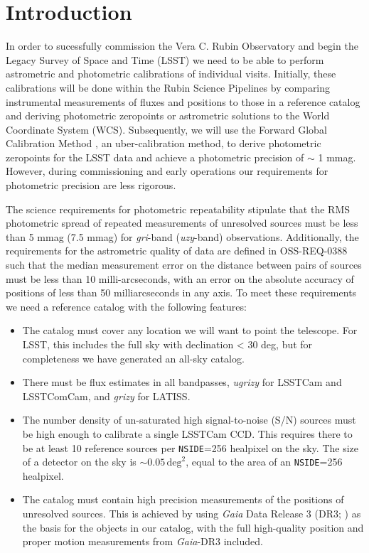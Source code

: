 \section{Introduction}
In order to sucessfully commission the Vera C. Rubin Observatory and begin the Legacy Survey of Space and Time (LSST) we need to be able to perform astrometric and photometric calibrations of individual visits.
Initially, these calibrations will be done within the Rubin Science Pipelines by comparing instrumental measurements of fluxes and positions to those in a reference catalog and deriving photometric zeropoints or astrometric solutions to the World Coordinate System (WCS).
Subsequently, we will use the Forward Global Calibration Method \citep[FGCM;][]{Burke:2018}, an uber-calibration method, to derive photometric zeropoints for the LSST data and achieve a photometric precision of $\sim$ 1 mmag.
However, during commissioning and early operations our requirements for photometric precision are less rigorous.

The science requirements for photometric repeatability \citep[OSS-REQ-0387;][]{LSE-30} stipulate that the RMS photometric spread of repeated measurements of unresolved sources must be less than 5 mmag (7.5 mmag) for \emph{gri}-band (\emph{uzy}-band) observations.
Additionally, the requirements for the astrometric quality of data are defined in OSS-REQ-0388 such that the median measurement error on the distance between pairs of sources must be less than 10 milli-arcseconds, with an error on the absolute accuracy of positions of less than 50 milliarcseconds in any axis.
To meet these requirements we need a reference catalog with the following features:

\begin{itemize}
    \item The catalog must cover any location we will want to point the telescope.
    For LSST, this includes the full sky with declination < 30 deg, but for completeness we have generated an all-sky catalog.
    \item There must be flux estimates in all bandpasses, \textit{ugrizy} for LSSTCam and LSSTComCam, and \textit{grizy} for LATISS.
    \item The number density of un-saturated high signal-to-noise (S/N) sources must be high enough to calibrate a single LSSTCam CCD.
    This requires there to be at least 10 reference sources per \texttt{NSIDE}=256 healpixel on the sky.
    The size of a detector on the sky is $\sim 0.05\,\mathrm{deg}^2$, equal to the area of an \texttt{NSIDE}=256 healpixel.
    \item The catalog must contain high precision measurements of the positions of unresolved sources.
    This is achieved by using \textit{Gaia} Data Release 3 (DR3; \citealt{GaiaCollaboration:2023-DR3}) as the basis for the objects in our catalog, with the full high-quality position and proper motion measurements from \textit{Gaia}-DR3 included.
\end{itemize}

